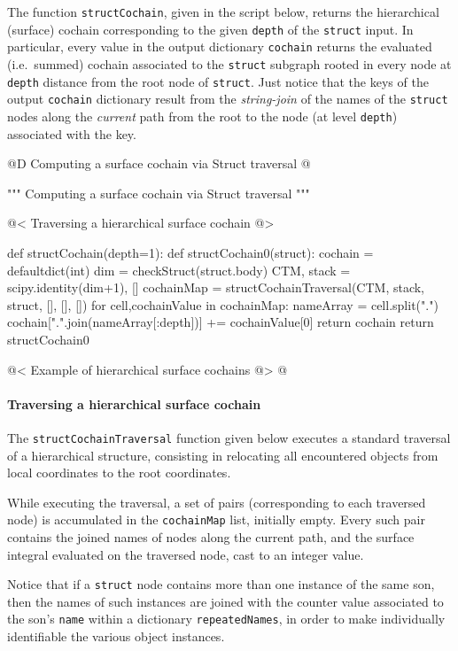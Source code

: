 \documentclass[11pt,oneside]{article}    %
\begin{document}
The function \texttt{structCochain}, given in the script below, returns the hierarchical (surface) cochain corresponding to the given \texttt{depth} of the \texttt{struct} input. In particular, every value in the output dictionary \texttt{cochain} returns the evaluated (i.e.~summed) cochain associated to the \texttt{struct} subgraph rooted in every node at  \texttt{depth} distance from the root node of \texttt{struct}. Just notice that the keys of the output \texttt{cochain} dictionary result from the \emph{string-join} of the names of the \texttt{struct} nodes along the \emph{current} path from the root to the node (at level \texttt{depth}) associated with the key.

@D Computing a surface cochain via Struct traversal
@{""" Computing a surface cochain via Struct traversal """

@< Traversing a hierarchical surface cochain @>

def structCochain(depth=1):
    def structCochain0(struct):
        cochain = defaultdict(int)
        dim = checkStruct(struct.body)
        CTM, stack = scipy.identity(dim+1), []
        cochainMap = structCochainTraversal(CTM, stack, struct, [], [], []) 
        for cell,cochainValue in cochainMap:
            nameArray = cell.split(".")
            cochain[".".join(nameArray[:depth])] += cochainValue[0]
        return cochain
    return structCochain0
    
@< Example of hierarchical surface cochains @>
@}

\paragraph{Traversing a hierarchical surface cochain}
The \texttt{structCochainTraversal} function given below executes a standard traversal of a hierarchical structure, consisting in relocating all encountered objects from local coordinates to the root coordinates. 

While executing the traversal, a set of pairs (corresponding to each traversed node) is accumulated in the \texttt{cochainMap} list, initially empty. Every such pair contains the joined names of nodes along the current path, and the surface integral evaluated on the traversed node, cast to an integer value. 

Notice that if a \texttt{struct} node contains more than one instance of the same son, then the names of such instances are joined with the counter value associated to the son's \texttt{name} within a dictionary \texttt{repeatedNames}, in order to make individually identifiable the various object instances.
\end{document}
